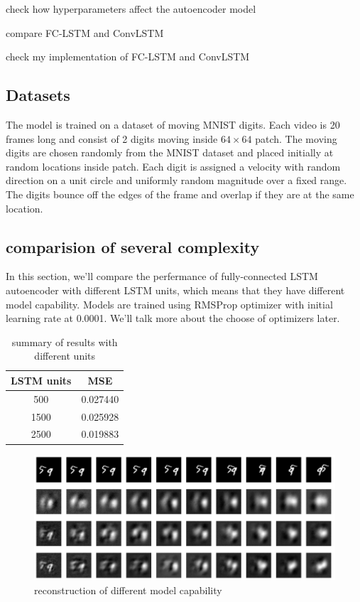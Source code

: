 \documentclass[twoside,a4paper,article]{combine}
\begin{document}
check how hyperparameters affect the autoencoder model

compare FC-LSTM and ConvLSTM 

check my implementation of FC-LSTM and ConvLSTM
\subsection{Datasets}
The model is trained on a dataset of moving MNIST digits. Each video is 20 frames long and consist of 2 digits moving inside $64\times64$
patch. The moving digits are chosen randomly from the MNIST dataset and placed initially at random locations inside patch. Each digit is
assigned a velocity with random direction on a unit circle and uniformly random magnitude over a fixed range. The digits bounce off the 
edges of the frame and overlap if they are at the same location.

\subsection{comparision of several complexity}
In this section, we'll compare the perfermance of fully-connected LSTM autoencoder with different LSTM units, which means that they have
different model capability. Models are trained using RMSProp optimizer with initial learning rate at 0.0001. We'll talk more about the
choose of optimizers later.

\begin{table}[h!]
\centering
\begin{tabular}{ c c } 
    \hline
    LSTM units & MSE \\
    \hline
    500 & 0.027440 \\
    1500 & 0.025928 \\
    2500 & 0.019883 \\
    \hline
    \end{tabular}
    \caption{summary of results with different units}
\label{table:units}
\end{table}

\begin{figure}[H]
    \includegraphics[width=\linewidth]{compare_units}
    \caption{reconstruction of different model capability}
    \label{fig:units}
\end{figure}
\end{document}
